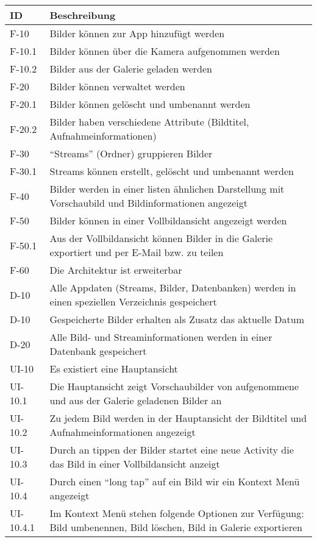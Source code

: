 \begin{center}
\begin{longtable}{|l|p{12cm}|}
\toprule
\textbf{ID} & \textbf{Beschreibung} \\
\hline
\endhead
\hline
\endfoot
F-10 & Bilder können zur App hinzufügt werden\\
F-10.1 & Bilder können über die Kamera aufgenommen werden\\
F-10.2 & Bilder aus der Galerie geladen werden\\
F-20 & Bilder können verwaltet werden\\
F-20.1 & Bilder können gelöscht und umbenannt werden\\
F-20.2 & Bilder haben verschiedene Attribute (Bildtitel, Aufnahmeinformationen)\\
F-30 & \enquote{Streams} (Ordner) gruppieren Bilder\\
F-30.1 & Streams können erstellt, gelöscht und umbenannt werden\\
F-40 & Bilder werden in einer listen ähnlichen Darstellung mit Vorschaubild und Bildinformationen angezeigt\\
F-50 & Bilder können in einer Vollbildansicht angezeigt werden\\
F-50.1 & Aus der Vollbildansicht können Bilder in die Galerie exportiert und per E-Mail bzw. zu teilen\\
F-60 & Die Architektur ist erweiterbar\\
\hline
D-10 & Alle Appdaten (Streams, Bilder, Datenbanken) werden in einen speziellen Verzeichnis gespeichert\\
D-10 & Gespeicherte Bilder erhalten als Zusatz das aktuelle Datum\\
D-20 & Alle Bild- und Streaminformationen werden in einer Datenbank gespeichert\\
\hline
UI-10 &  Es existiert eine Hauptansicht\\
UI-10.1 &  Die Hauptansicht zeigt Vorschaubilder von aufgenommene und aus der Galerie geladenen Bilder an\\
UI-10.2 &  Zu jedem Bild werden in der Hauptansicht der Bildtitel und Aufnahmeinformationen angezeigt\\
UI-10.3 &  Durch an tippen der Bilder startet eine neue Activity die das Bild in einer Vollbildansicht anzeigt\\
UI-10.4 &  Durch einen \enquote{long tap} auf ein Bild wir ein Kontext Menü angezeigt\\
UI-10.4.1 & Im Kontext Menü stehen folgende Optionen zur Verfügung: Bild umbenennen, Bild löschen, Bild in Galerie exportieren\\

\end{longtable}
\end{center}
